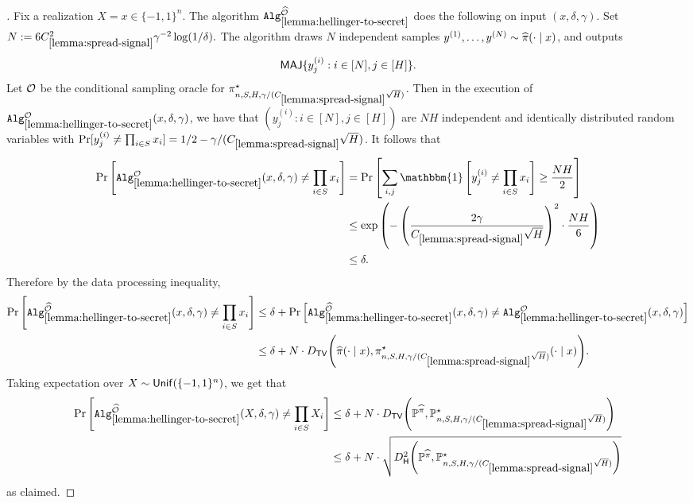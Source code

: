 \begin{proof}[]
Fix a realization $X = x \in \{-1,1\}^n$. The algorithm $\Alg_{\ref{lemma:hellinger-to-secret}}^{\wh\MO}$ does the following on input $(x,\delta,\gamma)$. Set $N := 6C_{\ref{lemma:spread-signal}}^2\gamma^{-2}\log(1/\delta).$ The algorithm draws $N$ independent samples $y^{(1)},\dots,y^{(N)} \sim \pihat(\cdot\mid{}x)$, and outputs 
\[\Maj \{y^{(i)}_j: i \in [N], j \in [H]\}.\]
Let $\MO$ be the conditional sampling oracle for $\pi^\st_{n,S,H,\gamma/(C_{\ref{lemma:spread-signal}}\sqrt{H})}$. Then in the execution of $\Alg_{\ref{lemma:hellinger-to-secret}}^{\MO}(x,\delta,\gamma)$, we have that $(y^{(i)}_j: i \in [N], j \in [H])$ are $NH$ independent and identically distributed random variables with $\Pr[y^{(i)}_j \neq \prod_{i \in S} x_i] = 1/2 - \gamma/(C_{\ref{lemma:spread-signal}}\sqrt{H})$. It follows that
\begin{align}
\Prr\left[\Alg_{\ref{lemma:hellinger-to-secret}}^{\MO}(x,\delta,\gamma) \neq \prod_{i \in S} x_i\right]
&= \Prr\left[\sum_{i,j} \mathbbm{1}\left[y^{(i)}_j \neq \prod_{i \in S} x_i\right] \geq \frac{NH}{2}\right] \\ 
&\leq \exp\left(-\left(\frac{2\gamma}{C_{\ref{lemma:spread-signal}}\sqrt{H}}\right)^2 \cdot \frac{NH}{6}\right) \\ 
&\leq \delta.
\end{align}
Therefore by the data processing inequality,
\begin{align}
\Prr\left[\Alg_{\ref{lemma:hellinger-to-secret}}^{\wh\MO}(x,\delta,\gamma) \neq \prod_{i \in S} x_i\right]
&\leq \delta + \Prr\left[\Alg_{\ref{lemma:hellinger-to-secret}}^{\wh\MO}(x,\delta,\gamma) \neq \Alg_{\ref{lemma:hellinger-to-secret}}^{\MO}(x,\delta,\gamma)\right] \\ 
&\leq \delta + N \cdot \Dtv{\pihat(\cdot\mid{}x)}{\pi^\st_{n,S,H,\gamma/(C_{\ref{lemma:spread-signal}}\sqrt{H})}(\cdot\mid{}x)}.
\end{align}
Taking expectation over $X \sim \Unif(\{-1,1\}^n)$, we get that
\begin{align}
\Prr\left[\Alg_{\ref{lemma:hellinger-to-secret}}^{\wh\MO}(X,\delta,\gamma) \neq \prod_{i \in S} X_i\right]
&\leq \delta + N \cdot \Dtv{\BP^{\pihat}}{\BP^\st_{n,S,H,\gamma/(C_{\ref{lemma:spread-signal}}\sqrt{H})}} \\ 
&\leq \delta + N \cdot \sqrt{\Dhels{\BP^{\pihat}}{\BP^\st_{n,S,H,\gamma/(C_{\ref{lemma:spread-signal}}\sqrt{H})}}}
\end{align}
as claimed.
\end{proof}


